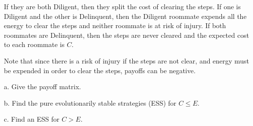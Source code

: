 \documentclass[reqno,12pt]{amsart}
\begin{document}
If they are both Diligent, then they split the cost of clearing
the steps.  If one is Diligent and the other is Delinquent, then
the Diligent roommate expends all the energy to clear the steps
and neither roommate is at risk of injury.  If both roommates
are Delinquent, then the steps are never cleared and the expected
cost to each roommate is $C$.

Note that since there is a risk of injury if the steps are not
clear, and energy must be expended in order to clear the steps,
payoffs can be negative.

\noindent
a.  Give the payoff matrix.

\noindent
b.  Find the pure evolutionarily stable strategies (ESS) for $C \le E$.

\noindent
c.  Find an ESS for $C>E$.
\end{document}
